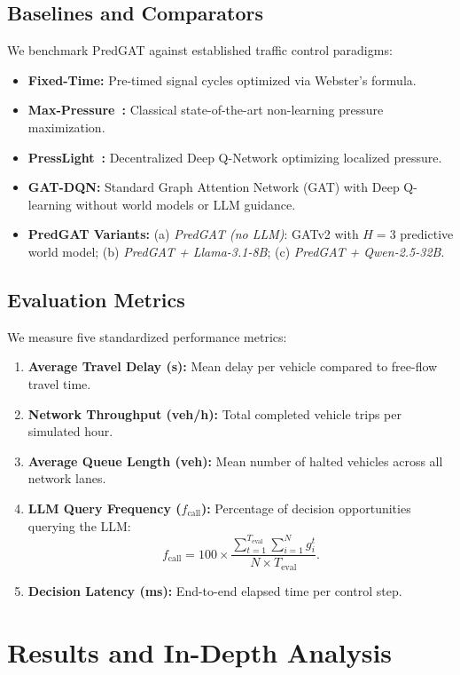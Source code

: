\documentclass[11pt,a4paper,twocolumn]{article}
\begin{document}
\subsection{Baselines and Comparators}
We benchmark PredGAT against established traffic control paradigms:
\begin{itemize}
    \item \textbf{Fixed-Time:} Pre-timed signal cycles optimized via Webster's formula.
    \item \textbf{Max-Pressure~\cite{varaiya2013max}:} Classical state-of-the-art non-learning pressure maximization.
    \item \textbf{PressLight~\cite{wei2019presslight}:} Decentralized Deep Q-Network optimizing localized pressure.
    \item \textbf{GAT-DQN:} Standard Graph Attention Network (GAT) with Deep Q-learning without world models or LLM guidance.
    \item \textbf{PredGAT Variants:} (a) \textit{PredGAT (no LLM)}: GATv2 with $H=3$ predictive world model; (b) \textit{PredGAT + Llama-3.1-8B}; (c) \textit{PredGAT + Qwen-2.5-32B}.
\end{itemize}

\subsection{Evaluation Metrics}
We measure five standardized performance metrics:
\begin{enumerate}
    \item \textbf{Average Travel Delay (s):} Mean delay per vehicle compared to free-flow travel time.
    \item \textbf{Network Throughput (veh/h):} Total completed vehicle trips per simulated hour.
    \item \textbf{Average Queue Length (veh):} Mean number of halted vehicles across all network lanes.
    \item \textbf{LLM Query Frequency ($f_{\text{call}}$):} Percentage of decision opportunities querying the LLM:
    \begin{equation}
        f_{\text{call}} = 100 \times \frac{\sum_{t=1}^{T_{\text{eval}}} \sum_{i=1}^{N} g_i^t}{N \times T_{\text{eval}}}.
    \end{equation}
    \item \textbf{Decision Latency (ms):} End-to-end elapsed time per control step.
\end{enumerate}

\section{Results and In-Depth Analysis}
\label{sec:results}
\end{document}
